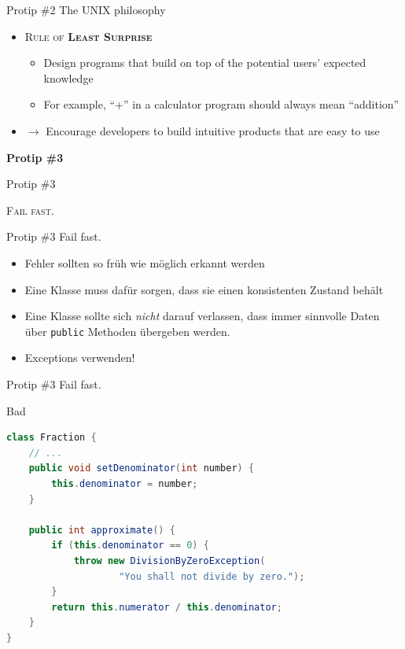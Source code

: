 \documentclass[18pt]{beamer}
\newcommand{\quotes}[1]{``#1''}
\begin{document}
\begin{frame}{Protip \#2 The UNIX philosophy}
    \begin{itemize}
        \item \textsc{Rule of \textbf{Least Surprise}}
        \begin{itemize}
            \item Design programs that build on top of the potential users' expected knowledge
            \item For example, \quotes{+} in a calculator program should always mean \quotes{addition}
        \end{itemize}
        \vspace{.2in}
        \item $\rightarrow$ Encourage developers to build intuitive products that are easy to use
    \end{itemize}
\end{frame}

\begin{frame}{\quad}
    \center
    \Huge{\textbf{Protip \#3}}
\end{frame}

\begin{frame}{Protip \#3}
    \begin{block}{}
        \center
        \textsc{Fail fast.}
    \end{block}
\end{frame}

\begin{frame}{Protip \#3 Fail fast.}
    \begin{itemize}
        \item Fehler sollten so früh wie möglich erkannt werden
        \item Eine Klasse muss dafür sorgen, dass sie einen konsistenten Zustand behält
        \item Eine Klasse sollte sich \textit{nicht} darauf verlassen, dass immer sinnvolle Daten über \texttt{public} Methoden übergeben werden.
        \item Exceptions verwenden!
    \end{itemize}
\end{frame}

\begin{frame}[fragile]{Protip \#3 Fail fast.}
        \begin{alertblock}{Bad}
            \begin{lstlisting}[language=Java,basicstyle=\scriptsize]
class Fraction {
    // ...
    public void setDenominator(int number) {
        this.denominator = number;
    }

    public int approximate() {
        if (this.denominator == 0) {
            throw new DivisionByZeroException(
                    "You shall not divide by zero.");
        }
        return this.numerator / this.denominator;
    }
}
            \end{lstlisting}
        \end{alertblock}
\end{frame}
\end{document}
